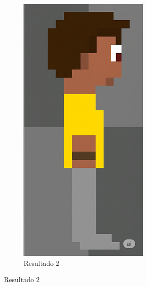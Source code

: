 \begin{figure}[htbp]
\begin{subfigure}{0.3\linewidth}
        \label{fig:geminiPro16a}
    \end{subfigure}
    \begin{subfigure}{0.3\linewidth}
        \includegraphics[width=1\linewidth]{figs/geminiPro/chat11/2res2.png}
        \caption{\small Resultado 2}
        \label{fig:geminiPro16b}
    \end{subfigure}
\end{figure}

